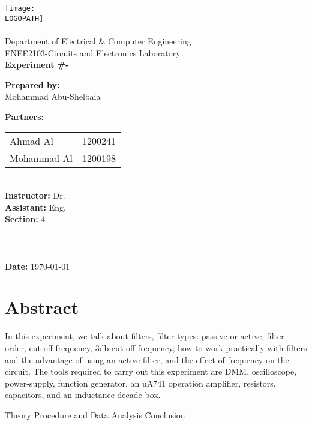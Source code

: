\documentclass[12pt]{article}
\def \LOGOPATH {assets/birzeit-logo.png}
\def \DEPARTEMENT {Department of Electrical \& Computer Engineering}
\def \COURSENUM {ENEE2103}
\def \COURSENAME {Circuits and Electronics Laboratory}
\def \REPORTTITLE {}
\def \STUDENTNAME {Mohammad Abu-Shelbaia}
\def \PARTNERAN {Ahmad Al}
\def \PARTNERAID {1200241}
\def \PARTNERBN {Mohammad Al}
\def \PARTNERBID {1200198}
\def \STUDENTID {1200198}
\def \INSTRUCTOR {Dr. }
\def \ASSISTANT {Eng. }
\def \REPORTNUM {-}
\begin{document}

\begin{titlepage}
    \vfill
    \begin{center}
        \texttt{[image: \\LOGOPATH]} \\
        \hfill \\
        \Large{\DEPARTEMENT} \\
        \Large{\COURSENUM\;-\;\COURSENAME} \\
        \vfill
        \textbf{\LARGE{Experiment \#\REPORTNUM}} \\
        \textbf{\LARGE{\REPORTTITLE}}
    \end{center}
    \vfill
    \begin{flushleft}
        \Large{\textbf{Prepared by:}\\ \STUDENTNAME\quad\STUDENTID} \\
        \Large{\textbf{Partners:}\\ 
        \begin{tabular}{@{}l@{\quad}l}
            \PARTNERAN & \PARTNERAID \\
            \PARTNERBN & \PARTNERBID \\
        \end{tabular}} \\
        \Large{\textbf{Instructor:} \INSTRUCTOR} \\
        \Large{\textbf{Assistant:} \ASSISTANT} \\
        \Large{\textbf{Section:} 4}\\
        \LARGE{\textbf{ }}\\
        \LARGE{\textbf{ }}\\
        \LARGE{\textbf{ }}\\
        \Large{\textbf{Date:} \today}\\
    \end{flushleft}
    \vfill
\end{titlepage}

\clearpage
{
\centering
\section*{Abstract}
In this experiment, we talk about filters, filter types: passive or active, filter order, cut-off frequency, 3db cut-off frequency, how to work practically with filters and the advantage of using an active filter, and the effect of frequency on the circuit. The tools required to carry out this experiment are DMM, oscilloscope, power-supply, function generator, an uA741 operation amplifier, resistors, capacitors, and an inductance decade box.
\clearpage
}

\tableofcontents
\clearpage
\setlength{\parskip}{\baselineskip}%
\listoffigures
\clearpage
\listoftables
\clearpage
{}
\h{Theory}
\clearpage
\h{Procedure and Data Analysis}
\clearpage
\h{Conclusion}
\clearpage
{}
\clearpage
\end{document}
